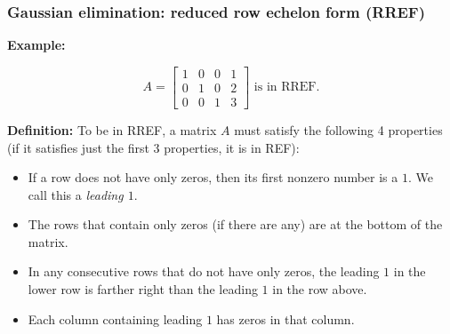 \begin{frame}[fragile]
\frametitle{Gaussian elimination: reduced row echelon form (RREF)}

\textbf{Example:}


$$A = \left[ \begin{array}{cccc}
\boxed{1} & 0 & 0 & 1 \\
0 & \boxed{1} & 0 & 2 \\
0 & 0 &  \boxed{1} & 3   
\end{array} \right] \text{ is in RREF.}$$

\textbf{Definition:} To be in RREF, a matrix $A$ must satisfy the following 4 properties (if it satisfies just the first 3 properties, it is in REF):

\begin{itemize}

\item If a row does not have only zeros, then its first nonzero number is a $1$. We call this a {\em leading $1$}.

\item The rows that contain only zeros (if there are any) are at the bottom of the matrix.

\item In any consecutive rows that do not have only zeros, the leading $1$ in the lower row is farther right than the leading $1$ in the row above.

\item Each column containing leading $1$ has zeros in that column.



\end{itemize}


\end{frame}
